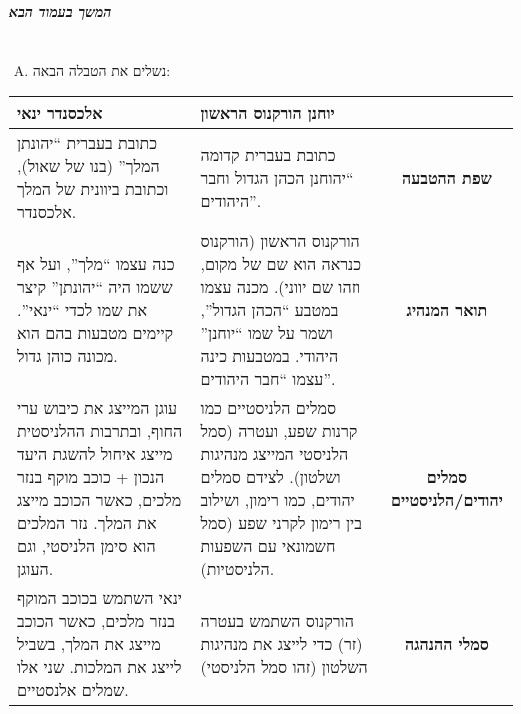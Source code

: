 \documentclass[]{article}
\newcommand\npage {\vfil {\hfil \textbf{\textit{המשך בעמוד הבא}}} \hfil \vfil \pagebreak}
\begin{document}
    \npage
    
    \section{}
    
    \begin{enumerate}[A.]
        \item נשלים את הטבלה הבאה: 
    \end{enumerate}
    
    \begin{tabularx}{\textwidth}{|X|X|c|}
        \hline
        \centering\textbf{אלכסנדר ינאי} & \centering\textbf{יוחנן הורקנוס הראשון} & \\
        \hline
        כתובת בעברית ``יהונתן המלך'' (בנו של שאול), וכתובת ביוונית של המלך אלכסנדר. &
        כתובת בעברית קדומה ``יהוחנן הכהן הגדול וחבר היהודים''. &
        \textbf{שפת ההטבעה} \\ 
        \hline
        כנה עצמו ``מלך'', ועל אף ששמו היה ``יהונתן'' קיצר את שמו לכדי ``ינאי''. קיימים מטבעות בהם הוא מכונה כוהן גדול. &
        הורקנוס הראשון (הורקנוס כנראה הוא שם של מקום, וזהו שם יווני). מכנה עצמו במטבע ``הכהן הגדול'', ושמר על שמו ``יוחנן'' היהודי. במטבעות כינה עצמו ``חבר היהודים''. 
        &
        \textbf{תואר המנהיג} \\
        \hline
        עוגן המייצג את כיבוש ערי החוף, ובתרבות ההלניסטית מייצג איחול להשגת היעד הנכון + כוכב מוקף בנזר מלכים, כאשר הכוכב מייצג את המלך. נזר המלכים הוא סימן הלניסטי, וגם העוגן.  &
        סמלים הלניסטיים כמו קרנות שפע, ועטרה (סמל הלניסטי המייצג מנהיגות ושלטון). לצידם סמלים יהודים, כמו רימון, ושילוב בין רימון לקרני שפע (סמל חשמונאי עם השפעות הלניסטיות). 
        & \textbf{סמלים יהודים/הלניסטיים} \\
        \hline
        ינאי השתמש בכוכב המוקף בנזר מלכים, כאשר הכוכב מייצג את המלך, בשביל לייצג את המלכות. שני אלו שמלים אלנסטיים. &
        הורקנוס השתמש בעטרה (זר) כדי לייצג את מנהיגות השלטון (זהו סמל הלניסטי)& \textbf{סמלי ההנהגה} \\
        \hline
    \end{tabularx}
\end{document}
